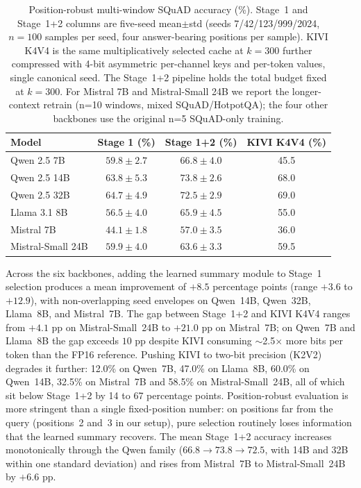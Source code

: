 \begin{table}[t]
\caption{Position-robust multi-window SQuAD accuracy (\%). Stage~1 and Stage~1+2 columns are five-seed mean$\pm$std (seeds 7/42/123/999/2024, $n{=}100$ samples per seed, four answer-bearing positions per sample). KIVI K4V4 is the same multiplicatively selected cache at $k{=}300$ further compressed with 4-bit asymmetric per-channel keys and per-token values, single canonical seed. The Stage~1+2 pipeline holds the total budget fixed at $k{=}300$. For Mistral 7B and Mistral-Small 24B we report the longer-context retrain (n=10 windows, mixed SQuAD/HotpotQA); the four other backbones use the original n=5 SQuAD-only training.}
\label{tab:squad_main}
\centering
\small
\setlength{\tabcolsep}{4pt}
\begin{tabular}{l ccc}
\toprule
\textbf{Model} & \textbf{Stage 1 (\%)} & \textbf{Stage 1+2 (\%)} & \textbf{KIVI K4V4 (\%)} \\
\midrule
Qwen 2.5 7B   & $59.8 \pm 2.7$  & $66.8 \pm 4.0$  & 45.5 \\
Qwen 2.5 14B  & $63.8 \pm 5.3$  & $73.8 \pm 2.6$  & 68.0 \\
Qwen 2.5 32B  & $64.7 \pm 4.9$  & $72.5 \pm 2.9$  & 69.0 \\
Llama 3.1 8B  & $56.5 \pm 4.0$  & $65.9 \pm 4.5$  & 55.0 \\
Mistral 7B    & $44.1 \pm 1.8$  & $57.0 \pm 3.5$  & 36.0 \\
Mistral-Small 24B & $59.9 \pm 4.0$  & $63.6 \pm 3.3$  & 59.5 \\
\bottomrule
\end{tabular}
\end{table}

Across the six backbones, adding the learned summary module to Stage~1 selection produces a mean improvement of $+8.5$ percentage points (range $+3.6$ to $+12.9$), with non-overlapping seed envelopes on Qwen~14B, Qwen~32B, Llama~8B, and Mistral~7B. The gap between Stage~1+2 and KIVI K4V4 ranges from $+4.1$ pp on Mistral-Small~24B to $+21.0$ pp on Mistral~7B; on Qwen~7B and Llama~8B the gap exceeds $10$ pp despite KIVI consuming $\sim$2.5$\times$ more bits per token than the FP16 reference. Pushing KIVI to two-bit precision (K2V2) degrades it further: 12.0\% on Qwen~7B, 47.0\% on Llama~8B, 60.0\% on Qwen~14B, 32.5\% on Mistral~7B and 58.5\% on Mistral-Small~24B, all of which sit below Stage~1+2 by 14 to 67 percentage points. Position-robust evaluation is more stringent than a single fixed-position number: on positions far from the query (positions~2 and~3 in our setup), pure selection routinely loses information that the learned summary recovers. The mean Stage~1+2 accuracy increases monotonically through the Qwen family ($66.8 \to 73.8 \to 72.5$, with 14B and 32B within one standard deviation) and rises from Mistral~7B to Mistral-Small~24B by $+6.6$ pp.

